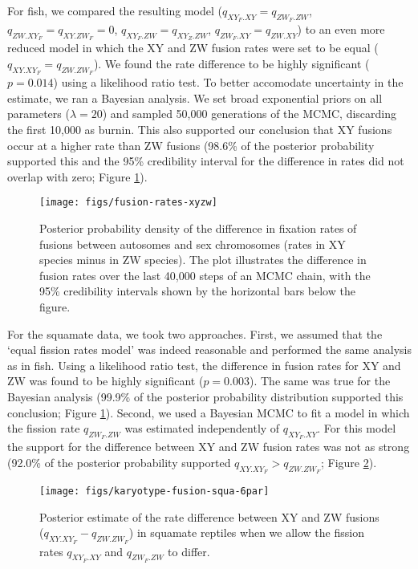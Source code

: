 For fish, we compared the resulting model ($q_{XY_F.XY} = q_{ZW_F.ZW}$, $q_{ZW.XY_F}=q_{XY.ZW_F}=\text{0}$, $q_{XY_F.ZW}=q_{XY_Z.ZW}$, $q_{ZW_F.XY}=q_{ZW.XY}$) to an even more reduced model in which the XY and ZW fusion rates were set to be equal ($q_{XY.XY_F}=q_{ZW.ZW_F}$). We found the rate difference to be highly significant ($p=\text{0.014}$) using a likelihood ratio test. To better accomodate uncertainty in the estimate, we ran a Bayesian analysis. We set broad exponential priors on all parameters ($\lambda=\text{20}$) and sampled 50,000 generations of the MCMC, discarding the first 10,000 as burnin. This also supported our conclusion that XY fusions occur at a higher rate than ZW fusions (98.6\% of the posterior probability supported this and the 95\% credibility interval for the difference in rates did not overlap with zero; Figure \ref{fig:pp-fuse-final}).

\begin{figure}
\centering
\texttt{[image: figs/fusion-rates-xyzw]}
\caption[Fusion rate difference between XY and ZW systems]{Posterior probability density of the difference in fixation rates of fusions between autosomes and sex chromosomes (rates in XY species minus in ZW species). The plot illustrates the difference in fusion rates over the last 40,000 steps of an MCMC chain, with the 95\% credibility intervals shown by the horizontal bars below the figure.}
\label{fig:pp-fuse-final}
\end{figure}

For the squamate data, we took two approaches. First, we assumed that the `equal fission rates model' was indeed reasonable and performed the same analysis as in fish. Using a likelihood ratio test, the difference in fusion rates for XY and ZW was found to be highly significant ($p=\text{0.003}$). The same was true for the Bayesian analysis (99.9\% of the posterior probability distribution supported this conclusion; Figure \ref{fig:pp-fuse-final}). Second, we used a Bayesian MCMC to fit a model in which the fission rate $q_{ZW_F.ZW}$ was estimated independently of $q_{XY_F.XY}$. For this model the support for the difference between XY and ZW fusion rates was not as strong (92.0\% of the posterior probability supported $q_{XY.XY_F} > q_{ZW.ZW_F}$; Figure \ref{fig:squa-dif}).

\begin{figure}[p]
\centering
\texttt{[image: figs/karyotype-fusion-squa-6par]}
\caption[Fusion rate difference between XY and ZW systems (alternate model)]{Posterior estimate of the rate difference between XY and ZW fusions ($q_{XY.XY_F} - q_{ZW.ZW_F}$) in squamate reptiles when we allow the fission rates $q_{XY_F.XY}$ and $q_{ZW_F.ZW}$ to differ.}
\label{fig:squa-dif}
\end{figure}

